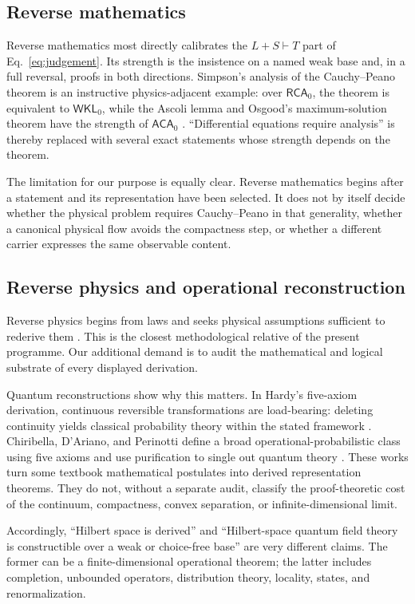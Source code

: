 \documentclass[11pt]{article}
\theoremstyle{definition}
\theoremstyle{remark}
\newcommand{\RCA}{\mathsf{RCA}_{0}}
\newcommand{\WKL}{\mathsf{WKL}_{0}}
\newcommand{\ACA}{\mathsf{ACA}_{0}}
\begin{document}
\subsection{Reverse mathematics}

Reverse mathematics most directly calibrates the \(L+S\vdash T\) part of
Eq.~\eqref{eq:judgement}.  Its strength is the insistence on a named weak base
and, in a full reversal, proofs in both directions.  Simpson's analysis of the
Cauchy--Peano theorem is an instructive physics-adjacent example: over
\(\RCA\), the theorem is equivalent to \(\WKL\), while the Ascoli lemma and
Osgood's maximum-solution theorem have the strength of \(\ACA\)
\cite{Simpson1984}.  ``Differential equations require analysis'' is thereby
replaced with several exact statements whose strength depends on the theorem.

The limitation for our purpose is equally clear.  Reverse mathematics begins
after a statement and its representation have been selected.  It does not by
itself decide whether the physical problem requires Cauchy--Peano in that
generality, whether a canonical physical flow avoids the compactness step, or
whether a different carrier expresses the same observable content.

\subsection{Reverse physics and operational reconstruction}

Reverse physics begins from laws and seeks physical assumptions sufficient to
rederive them \cite{CarcassiAidala2022}.  This is the closest methodological
relative of the present programme.  Our additional demand is to audit the
mathematical and logical substrate of every displayed derivation.

Quantum reconstructions show why this matters.  In Hardy's five-axiom
derivation, continuous reversible transformations are load-bearing: deleting
continuity yields classical probability theory within the stated framework
\cite{Hardy2001}.  Chiribella, D'Ariano, and Perinotti define a broad
operational-probabilistic class using five axioms and use purification to
single out quantum theory \cite{Chiribella2011}.  These works turn some
textbook mathematical postulates into derived representation theorems.  They
do not, without a separate audit, classify the proof-theoretic cost of the
continuum, compactness, convex separation, or infinite-dimensional limit.

Accordingly, ``Hilbert space is derived'' and ``Hilbert-space quantum field
theory is constructible over a weak or choice-free base'' are very different
claims.  The former can be a finite-dimensional operational theorem; the
latter includes completion, unbounded operators, distribution theory,
locality, states, and renormalization.
\end{document}
